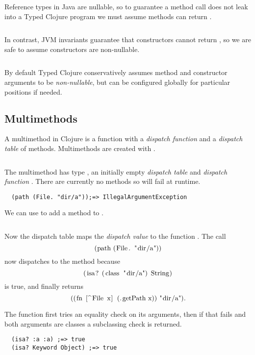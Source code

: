 Reference types in Java are nullable, so to guarantee a method call does not
leak  into a Typed Clojure program we
must assume methods can return .

\begin{exmp}
\inputminted[firstline=6,lastline=8]{clojure}{code/demo/src/demo/parent3.clj}
\end{exmp}

In contrast, JVM invariants guarantee that  constructors cannot return ,
so we are safe to assume constructors are non-nullable.

\begin{exmp}
\inputminted[firstline=15,lastline=16]{clojure}{code/demo/src/demo/parent3.clj}
\end{exmp}

By default Typed Clojure conservatively assumes method and constructor arguments to be \emph{non-nullable},
but can be configured globally for particular positions if needed.

\subsection{Multimethods}

\label{sec:multioverview}

A multimethod in Clojure is a function with a \emph{dispatch
function} and a \emph{dispatch table} of methods. Multimethods are created with {}.
\inputminted[firstline=5,lastline=7]{clojure}{code/demo/src/demo/rep.clj}
The multimethod  has type , an initially empty \emph{dispatch table}
and \emph{dispatch function} .
There are currently no methods so  will fail at runtime.
\begin{verbatim}
  (path (File. "dir/a"));=> IllegalArgumentException
\end{verbatim}

We can use {} to add a method to .
\inputminted[firstline=8,lastline=8]{clojure}{code/demo/src/demo/rep.clj}
Now the dispatch table maps
the \emph{dispatch value}  to the function
. 
The call 
$$
\clj{(path (File. "dir/a"))}
$$
now dispatches to the  method because
$$
\clj{(isa? (class "dir/a") String)}
$$
is true, and finally returns 
$$
\clj{((fn [^File x] (.getPath x)) "dir/a")}.
$$

The  function first tries an equality check
on its arguments, then if that fails
and both arguments are classes a subclassing
check is returned.
\begin{verbatim}
  (isa? :a :a) ;=> true
  (isa? Keyword Object) ;=> true
\end{verbatim}

